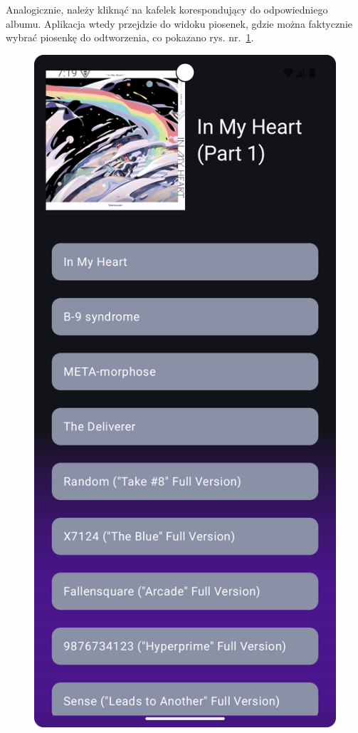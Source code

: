 Analogicznie, należy kliknąć na kafelek korespondujący do odpowiedniego albumu. Aplikacja wtedy przejdzie do widoku piosenek, gdzie można faktycznie wybrać piosenkę do odtworzenia, co pokazano rys. nr.~\ref{fig:tutorial_song_view}. 

\begin{figure}[H]
	\centering
	\includegraphics[width=1\textwidth]{images/tutorial_song_view.png}
	\caption{}
	\label{fig:tutorial_song_view}
\end{figure}


